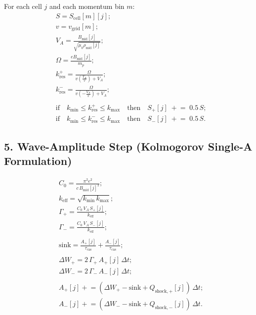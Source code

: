 For each cell $j$ and each momentum bin $m$:
\[
\begin{aligned}
& S = S_{\text{cell}}[m][j]; \\
& v = v_{\text{grid}}[m]; \\
& V_A = \frac{B_{\text{mid}}[j]}{\sqrt{\mu_0 \rho_{\text{mid}}[j]}}; \\
& \Omega = \frac{e B_{\text{mid}}[j]}{m_p}; \\
& k_{\text{res}}^{+}  = \frac{\Omega}{v \left( \frac{V_A}{v} \right) + V_A}; \\
& k_{\text{res}}^{-} = \frac{\Omega}{v \left( -\frac{V_A}{v} \right) + V_A}; \\
\\
& \text{if} \quad k_{\min} \leq k_{\text{res}}^{+} \leq k_{\max}
\quad \text{then} \quad S_{+}[j] \; \mathrel{+}= \; 0.5 \, S; \\
& \text{if} \quad k_{\min} \leq k_{\text{res}}^{-} \leq k_{\max}
\quad \text{then} \quad S_{-}[j] \; \mathrel{+}= \; 0.5 \, S.
\end{aligned}
\]

\subsection*{5. Wave-Amplitude Step (Kolmogorov Single-A Formulation)}

\[
\begin{aligned}
& C_0 = \frac{\pi^2 e^2}{c\, B_{\text{mid}}[j]^2}; \\
& k_{\text{eff}} = \sqrt{k_{\min} \, k_{\max}}; \\
& \Gamma_{+}  =  \frac{C_0 \, V_A \, S_{+}[j]}{k_{\text{eff}}}; \\
& \Gamma_{-} =  \frac{C_0 \, V_A \, S_{-}[j]}{k_{\text{eff}}}; \\
\\
& \text{sink} = \frac{A_{+}[j]}{\tau_{\text{cas}}} + \frac{A_{-}[j]}{\tau_{\text{cas}}}; \\
\\
& \Delta W_{+}  = 2 \, \Gamma_{+} \, A_{+}[j] \, \Delta t; \\
& \Delta W_{-} = 2 \, \Gamma_{-} \, A_{-}[j] \, \Delta t; \\
\\
& A_{+}[j] \mathrel{+}= \left( \Delta W_{+} - \text{sink} + Q_{\text{shock},+}[j] \right) \, \Delta t; \\
& A_{-}[j] \mathrel{+}= \left( \Delta W_{-} - \text{sink} + Q_{\text{shock},-}[j] \right) \, \Delta t.
\end{aligned}
\]

